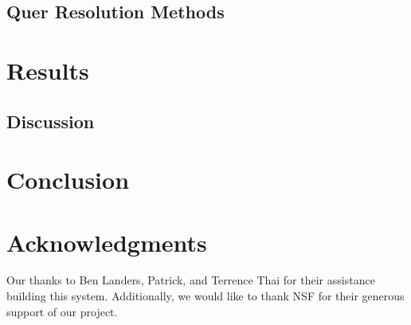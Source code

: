\documentclass{sig-alternate}
\begin{document}
  
\subsection{Quer Resolution Methods} 



\section{Results}




\subsection{Discussion}



\section{Conclusion}



\section{Acknowledgments}
Our thanks to Ben Landers, Patrick, and Terrence Thai for their assistance building this system. Additionally, we would like to thank NSF for their generous support of our project.


  
\end{document}
